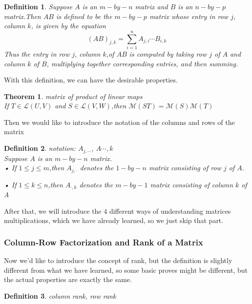 \documentclass{article}
\newtheorem{theorem}{Theorem}[subsection]
\newtheorem{definition}{Definition}[subsection]
\begin{document}
\begin{CJK}{UTF8}{gkai}
\begin{definition}
    Suppose $A$ is an $m-by-n$ matrix and $B$ is an $n-by-p $ matrix.Then $AB$ is defined to be the $m-by-p$ matrix whose entry in row $j$, column $k$, is given by the equation
    \[(AB)_{j,k} = \sum_{i = 1}^n A_{j,i}\cdots B_{i,k}\]
    Thus the entry in row $j$, column $k$,of $AB$ is computed by taking row $j$ of $A$ and column $k$ of $B$, multiplying together corresponding entries, and then summing.
\end{definition}
    
With this definition, we can have the desirable properties.
\begin{theorem}
    matrix of product of linear maps\\

    If $T \in \mathcal{L}(U,V)$ and $S \in \mathcal{L}(V,W)$,then $\mathcal{M}(ST) = \mathcal{M}(S)\mathcal{M}(T)$
\end{theorem}

Then we would like to introduce the notation of the columns and rows of the matrix\\

\begin{definition}
    notation: $A_{j,\cdots}$, $A{\cdots,k}$\\

    Suppose $A$ is an $m-by-n$ matrix.\\

    • If $1 \leq j \leq m$,then $A_{j,\cdot}$ denotes the $1-by-n$ matrix consisting of row $j$ of $A$.

    • If $1 \leq k \leq n$,then $A_{\cdot,k}$ denotes the $m-by-1$ matrix consisting of column $k$ of A
\end{definition}

After that, we will introduce the $4$ different ways of understanding matrices multiplications, which we have already learned, so we just skip that part.\\

\subsubsection{Column-Row Factorization and Rank of a Matrix}

Now we'd like to introduce the concept of rank, but the definition is slightly different from what we have learned, so some basic proves might be different, but the actual properties are exactly the same.\\

\begin{definition}
    column rank, row rank\\


\end{definition}
\end{CJK}
\end{document}
